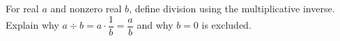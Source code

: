 For real $a$ and nonzero real $b$, define division using the multiplicative inverse. Explain why $a\div b=a\cdot\dfrac{1}{b}=\dfrac{a}{b}$ and why $b=0$ is excluded.
